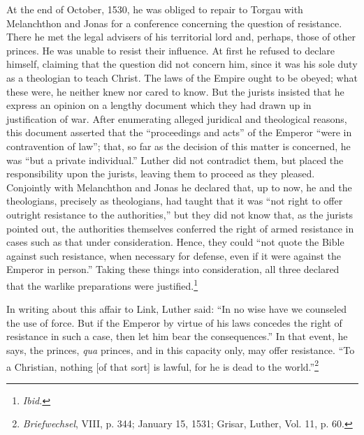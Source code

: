 At the end of October, 1530, he was obliged to repair to Torgau
with Melanchthon and Jonas for a conference concerning the question
of resistance. There he met the legal advisers of his territorial
lord and, perhaps, those of other princes. He was unable to resist
their influence. At first he refused to declare himself, claiming that
the question did not concern him, since it was his sole duty as a
theologian to teach Christ. The laws of the Empire ought to be
obeyed; what these were, he neither knew nor cared to know. But
the jurists insisted that he express an opinion on a lengthy document
which they had drawn up in justification of war.
After enumerating alleged juridical and theological reasons, this document
asserted that the “proceedings and acts” of the Emperor “were in
contravention of law”; that, so far as the decision of this matter is
concerned, he was “but a private individual.” Luther did not contradict
them, but placed the responsibility upon the jurists, leaving
them to proceed as they pleased. Conjointly with Melanchthon and
Jonas he declared that, up to now, he and the theologians, precisely
as theologians, had taught that it was “not right to offer outright
resistance to the authorities,” but they did not know that, as the
jurists pointed out, the authorities themselves conferred the right of
armed resistance in cases such as that under consideration. Hence,
they could “not quote the Bible against such resistance, when necessary
for defense, even if it were against the Emperor in person.”
Taking these things into consideration, all three declared that the
warlike preparations were justified.\footnote{\textit{Ibid.}}

In writing about this affair to Link, Luther said: “In no wise
have we counseled the use of force. But if the Emperor by virtue of
his laws concedes the right of resistance in such a case, then let
him bear the consequences.” In that event, he says, the princes,
\textit{qua} princes, and in this capacity only, may offer resistance. “To
a Christian, nothing [of that sort] is lawful, for he is dead to the
world.”\footnote{\textit{Briefwechsel}, VIII, p. 344; January 15, 1531; Grisar, Luther, Vol. 11, p. 60.}


